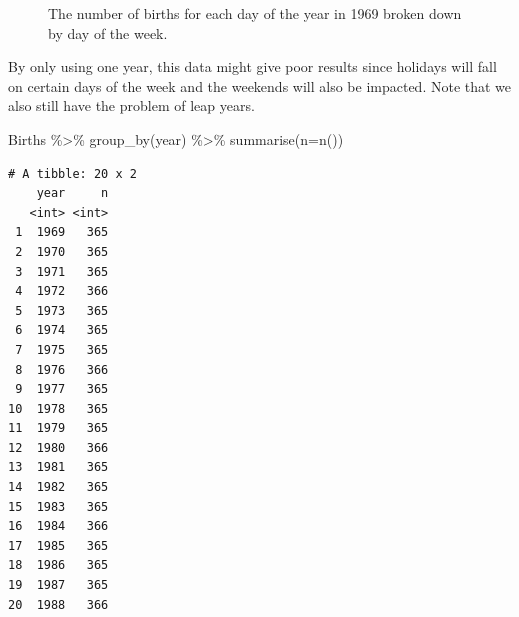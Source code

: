 \documentclass[
  letterpaper,
  DIV=11,
  numbers=noendperiod]{scrreprt}
\newenvironment{Shaded}{\begin{snugshade}}{\end{snugshade}}
\newcommand{\AttributeTok}[1]{\textcolor[rgb]{0.40,0.45,0.13}{#1}}
\newcommand{\FunctionTok}[1]{\textcolor[rgb]{0.28,0.35,0.67}{#1}}
\newcommand{\NormalTok}[1]{\textcolor[rgb]{0.00,0.23,0.31}{#1}}
\newcommand{\SpecialCharTok}[1]{\textcolor[rgb]{0.37,0.37,0.37}{#1}}
\begin{document}
\begin{figure}[H]


\caption{\label{fig-scat72}The number of births for each day of the year
in 1969 broken down by day of the week.}

\end{figure}%

By only using one year, this data might give poor results since holidays
will fall on certain days of the week and the weekends will also be
impacted. Note that we also still have the problem of leap years.

\begin{Shaded}
\begin{Highlighting}[]
\NormalTok{Births }\SpecialCharTok{\%\textgreater{}\%}
  \FunctionTok{group\_by}\NormalTok{(year) }\SpecialCharTok{\%\textgreater{}\%}
  \FunctionTok{summarise}\NormalTok{(}\AttributeTok{n=}\FunctionTok{n}\NormalTok{())}
\end{Highlighting}
\end{Shaded}

\begin{verbatim}
# A tibble: 20 x 2
    year     n
   <int> <int>
 1  1969   365
 2  1970   365
 3  1971   365
 4  1972   366
 5  1973   365
 6  1974   365
 7  1975   365
 8  1976   366
 9  1977   365
10  1978   365
11  1979   365
12  1980   366
13  1981   365
14  1982   365
15  1983   365
16  1984   366
17  1985   365
18  1986   365
19  1987   365
20  1988   366
\end{verbatim}
\end{document}
